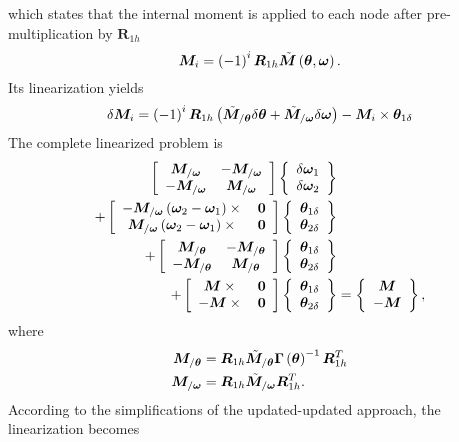 \documentclass[10pt,dvips,fleqn,subeqn]{report}
\newcommand{\T}[1]{\bm{#1}}
\begin{document}
which states that the internal moment is applied to each node 
after pre-multiplication by $\T{R}_{1h}$
\begin{equation}
	\T{M}_i = \plbr{-1}^i \T{R}_{1h} \tilde{\T{M}}\plbr{\T{\theta}, \T{\omega}} .
\end{equation}
Its linearization yields
\begin{equation}
	\delta\T{M}_i = \plbr{-1}^i \T{R}_{1h} \plbr{
		\tilde{\T{M}}_{/\T{\theta}} \delta \T{\theta}
		+ \tilde{\T{M}}_{/\T{\omega}} \delta\T{\omega}
	} - \T{M}_i \times \T{\theta}_{1\delta}
\end{equation}
The complete linearized problem is
\begin{align}
	\sqbr{\matr{cc}{
		\T{M}_{/\T{\omega}} & - \T{M}_{/\T{\omega}} \\
		- \T{M}_{/\T{\omega}} & \T{M}_{/\T{\omega}}
	}}\cubr{\cvvect{
		\delta\T{\omega}_1 \\
		\delta\T{\omega}_2
	}} & \nonumber \\
	+ \sqbr{\matr{cc}{
		- \T{M}_{/\T{\omega}} \plbr{\T{\omega}_2 - \T{\omega}_1}\times{} & \T{0} \\
		\T{M}_{/\T{\omega}} \plbr{\T{\omega}_2 - \T{\omega}_1}\times{} & \T{0}
	}} \cubr{\cvvect{
		\T{\theta}_{1\delta} \\
		\T{\theta}_{2\delta}
	}} & \nonumber \\
	+ \sqbr{\matr{cc}{
		\T{M}_{/\T{\theta}} & - \T{M}_{/\T{\theta}} \\
		- \T{M}_{/\T{\theta}} & \T{M}_{/\T{\theta}}
	}} \cubr{\cvvect{
		\T{\theta}_{1\delta} \\
		\T{\theta}_{2\delta}
	}} & \nonumber \\
	+ \sqbr{\matr{cc}{
		\T{M}\times{} & \T{0} \\
		- \T{M}\times{} & \T{0}
	}} \cubr{\cvvect{
		\T{\theta}_{1\delta} \\
		\T{\theta}_{2\delta}
	}} &= \cubr{\cvvect{
		\T{M} \\
		- \T{M}
	}} ,
\end{align}
where
\begin{subequations}
\begin{align}
	\T{M}_{/\T{\theta}} &= \T{R}_{1h} \tilde{\T{M}}_{/\T{\theta}} \T{\Gamma}\plbr{\T{\theta}}^{-1} \T{R}_{1h}^T \\
	\T{M}_{/\T{\omega}} &= \T{R}_{1h} \tilde{\T{M}}_{/\T{\omega}} \T{R}_{1h}^T .
\end{align}
\end{subequations}
According to the simplifications of the updated-updated approach, the linearization becomes
\end{document}
